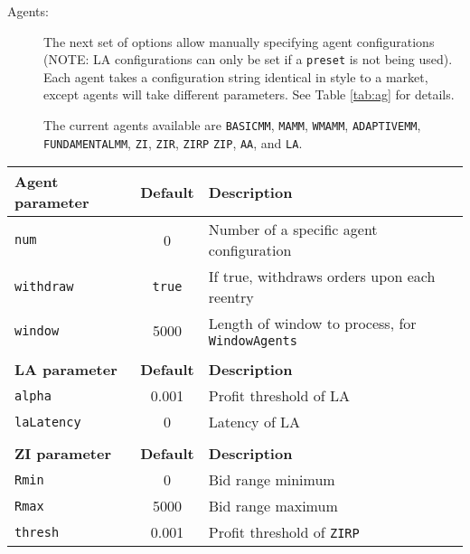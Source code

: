 \documentclass[11pt]{article}
\begin{document}
\begin{description}
\item[Agents:] The next set of options allow manually specifying agent
  configurations (NOTE: LA configurations can only be set if a \texttt{preset} is not being used). 
   Each agent takes a configuration string identical in style to a market, except agents
  will take different parameters. See Table \ref{tab:ag} for details.
  
  The current agents available are \texttt{BASICMM}, \texttt{MAMM}, \texttt{WMAMM}, \texttt{ADAPTIVEMM}, \texttt{FUNDAMENTALMM},
  \texttt{ZI}, \texttt{ZIR}, \texttt{ZIRP} \texttt{ZIP}, \texttt{AA}, and \texttt{LA}.
  

\end{description}

\begin{table}
\centering
\begin{tabulary}{\textwidth}{lcL}\toprule
\textbf{Agent parameter} & \textbf{Default} & \textbf{Description} \\ \midrule
\texttt{num}			& 0	& Number of a specific agent configuration \\
\texttt{withdraw}		& \texttt{true}	& If true, withdraws orders upon each reentry \\
\texttt{window}		& 5000	& Length of window to process, for \texttt{WindowAgents} \\


\\ \toprule
\textbf{LA parameter}   & \textbf{Default} & \textbf{Description} \\ \midrule
\texttt{alpha}			& 0.001 & Profit threshold of LA \\
\texttt{laLatency}		& 0  & Latency of LA \\

\\ \toprule
\textbf{ZI parameter}   & \textbf{Default} & \textbf{Description} \\ \midrule
\texttt{Rmin}			& 0	& Bid range minimum \\
\texttt{Rmax}			& 5000	& Bid range maximum \\
\texttt{thresh}		& 0.001 & Profit threshold of \texttt{ZIRP} \\


\end{tabulary}
\end{table}
\end{document}
